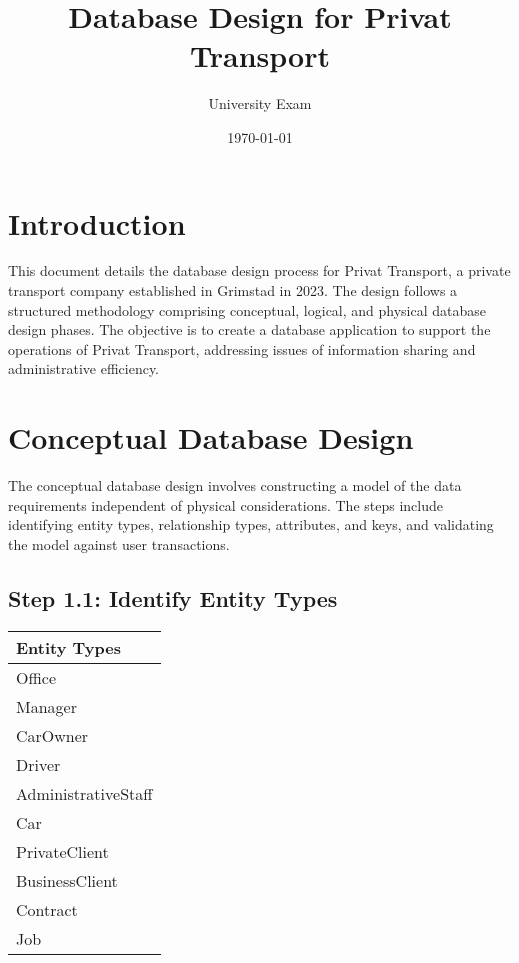 \documentclass[a4paper,12pt]{article}
\title{Database Design for Privat Transport}
\author{University Exam}
\date{\today}
\begin{document}
\maketitle

\section*{Introduction}
This document details the database design process for Privat Transport, a private transport company established in Grimstad in 2023. The design follows a structured methodology comprising conceptual, logical, and physical database design phases. The objective is to create a database application to support the operations of Privat Transport, addressing issues of information sharing and administrative efficiency.

\section*{Conceptual Database Design}
The conceptual database design involves constructing a model of the data requirements independent of physical considerations. The steps include identifying entity types, relationship types, attributes, and keys, and validating the model against user transactions.

\subsection*{Step 1.1: Identify Entity Types}
\begin{table}[ht]
\centering
\begin{tabularx}{\textwidth}{|X|}
\hline
\rowcolor{blue!20} \textbf{Entity Types} \\
\hline
Office \\
Manager \\
CarOwner \\
Driver \\
AdministrativeStaff \\
Car \\
PrivateClient \\
BusinessClient \\
Contract \\
Job \\
\hline
\end{tabularx}
\end{table}
\end{document}
